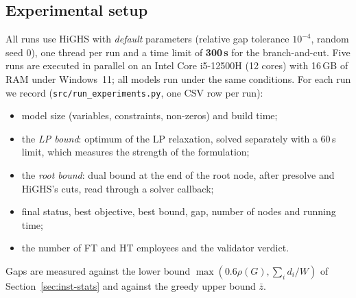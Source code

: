 \subsection{Experimental setup}
\label{sec:setup}

All runs use HiGHS with \emph{default} parameters (relative gap tolerance
$10^{-4}$, random seed 0), one thread per run and a time limit of
\textbf{300\,s} for the branch-and-cut. Five runs are executed in parallel on
an Intel Core i5-12500H (12 cores) with 16\,GB of RAM under Windows~11; all
models run under the same conditions. For each run we record
(\texttt{src/run\_experiments.py}, one CSV row per run):
\begin{itemize}[nosep]
  \item model size (variables, constraints, non-zeros) and build time;
  \item the \emph{LP bound}: optimum of the LP relaxation, solved separately
    with a 60\,s limit, which measures the strength of the formulation;
  \item the \emph{root bound}: dual bound at the end of the root node, after
    presolve and HiGHS's cuts, read through a solver callback;
  \item final status, best objective, best bound, gap, number of nodes and
    running time;
  \item the number of FT and HT employees and the validator verdict.
\end{itemize}
Gaps are measured against the lower bound $\max(0.6\rho(G),\sum_i d_i/W)$ of
Section~\ref{sec:inst-stats} and against the greedy upper bound $\bar z$.
